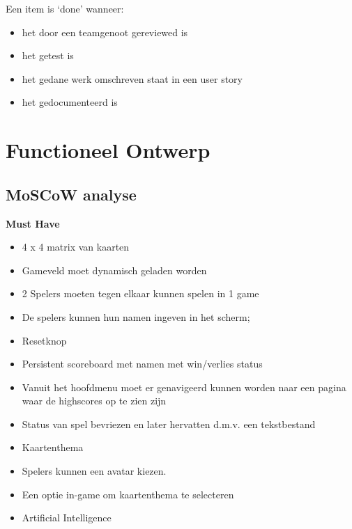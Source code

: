 \documentclass[a4paper,titlepage,11pt]{article}
\begin{document}
Een item is `done' wanneer:

\begin{itemize}

\item het door een teamgenoot gereviewed is
\item het getest is
\item het gedane werk omschreven staat in een user story
\item het gedocumenteerd is
\end{itemize}

\clearpage

\section{Functioneel Ontwerp}

\subsection{MoSCoW analyse}

{\bf Must Have}

\begin{itemize}
\item 4 x 4 matrix van kaarten
\item Gameveld moet dynamisch geladen worden
\item 2 Spelers moeten tegen elkaar kunnen spelen in 1 game
\item De spelers kunnen hun namen ingeven in het scherm;
\item Resetknop
\item Persistent scoreboard met namen met win/verlies status
\item Vanuit het hoofdmenu moet er genavigeerd kunnen worden naar een pagina waar de 
  highscores op te zien zijn
\item Status van spel bevriezen en later hervatten d.m.v. een tekstbestand
\end{itemize}

\begin{itemize}
\item Kaartenthema
\end{itemize}
\begin{itemize}
\item Spelers kunnen een avatar kiezen.
\end{itemize}
\begin{itemize}
\item Een optie in-game om kaartenthema te selecteren
\item Artificial Intelligence
\end{itemize}
\end{document}
